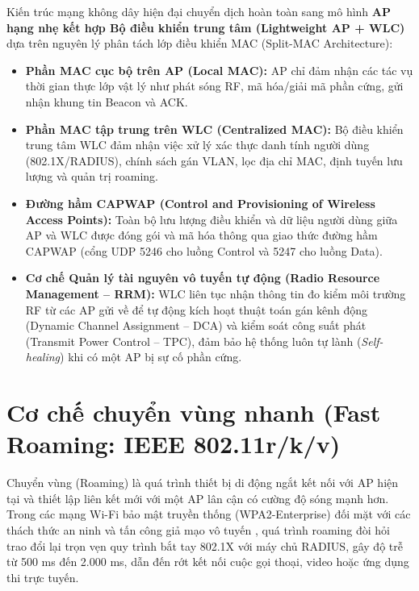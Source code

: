 Kiến trúc mạng không dây hiện đại chuyển dịch hoàn toàn sang mô hình \textbf{AP hạng nhẹ kết hợp Bộ điều khiển trung tâm (Lightweight AP + WLC)} dựa trên nguyên lý phân tách lớp điều khiển MAC (Split-MAC Architecture):

\begin{itemize}
    \item \textbf{Phần MAC cục bộ trên AP (Local MAC):} AP chỉ đảm nhận các tác vụ thời gian thực lớp vật lý như phát sóng RF, mã hóa/giải mã phần cứng, gửi nhận khung tin Beacon và ACK.
    \item \textbf{Phần MAC tập trung trên WLC (Centralized MAC):} Bộ điều khiển trung tâm WLC đảm nhận việc xử lý xác thực danh tính người dùng (802.1X/RADIUS), chính sách gán VLAN, lọc địa chỉ MAC, định tuyến lưu lượng và quản trị roaming.
    \item \textbf{Đường hầm CAPWAP (Control and Provisioning of Wireless Access Points):} Toàn bộ lưu lượng điều khiển và dữ liệu người dùng giữa AP và WLC được đóng gói và mã hóa thông qua giao thức đường hầm CAPWAP (cổng UDP 5246 cho luồng Control và 5247 cho luồng Data).
    \item \textbf{Cơ chế Quản lý tài nguyên vô tuyến tự động (Radio Resource Management -- RRM):} WLC liên tục nhận thông tin đo kiểm môi trường RF từ các AP gửi về để tự động kích hoạt thuật toán gán kênh động (Dynamic Channel Assignment -- DCA) và kiểm soát công suất phát (Transmit Power Control -- TPC), đảm bảo hệ thống luôn tự lành (\textit{Self-healing}) khi có một AP bị sự cố phần cứng.
\end{itemize}

\section{Cơ chế chuyển vùng nhanh (Fast Roaming: IEEE 802.11r/k/v)}

Chuyển vùng (Roaming) là quá trình thiết bị di động ngắt kết nối với AP hiện tại và thiết lập liên kết mới với một AP lân cận có cường độ sóng mạnh hơn. Trong các mạng Wi-Fi bảo mật truyền thống (WPA2-Enterprise) đối mặt với các thách thức an ninh và tấn công giả mạo vô tuyến \cite{mishra2019security}, quá trình roaming đòi hỏi trao đổi lại trọn vẹn quy trình bắt tay 802.1X với máy chủ RADIUS, gây độ trễ từ 500 ms đến 2.000 ms, dẫn đến rớt kết nối cuộc gọi thoại, video hoặc ứng dụng thi trực tuyến.

